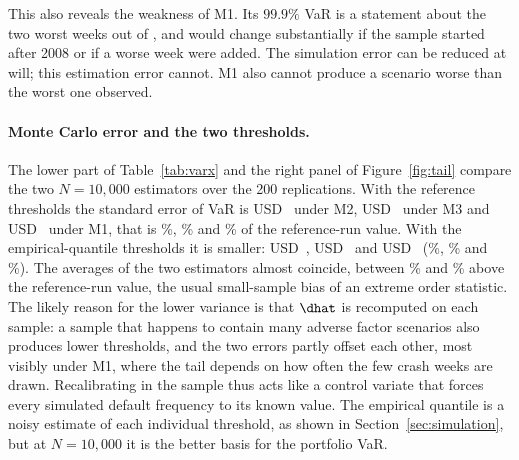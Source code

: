 This also reveals the weakness of M1. Its $99.9\%$ VaR is a statement about the two worst weeks out of , and would change substantially if the sample started after 2008 or if a worse week were added. The simulation error can be reduced at will; this estimation error cannot. M1 also cannot produce a scenario worse than the worst one observed.

\paragraph{Monte Carlo error and the two thresholds.}
The lower part of Table~\ref{tab:varx} and the right panel of Figure~\ref{fig:tail} compare the two $N=10{,}000$ estimators over the 200 replications. With the reference thresholds the standard error of VaR is USD~ under M2, USD~ under M3 and USD~ under M1, that is \%, \% and \% of the reference-run value. With the empirical-quantile thresholds it is smaller: USD~, USD~ and USD~ (\%, \% and \%). The averages of the two estimators almost coincide, between \% and \% above the reference-run value, the usual small-sample bias of an extreme order statistic. The likely reason for the lower variance is that $\dhat$ is recomputed on each sample: a sample that happens to contain many adverse factor scenarios also produces lower thresholds, and the two errors partly offset each other, most visibly under M1, where the tail depends on how often the few crash weeks are drawn. Recalibrating in the sample thus acts like a control variate that forces every simulated default frequency to its known value. The empirical quantile is a noisy estimate of each individual threshold, as shown in Section~\ref{sec:simulation}, but at $N=10{,}000$ it is the better basis for the portfolio VaR.

